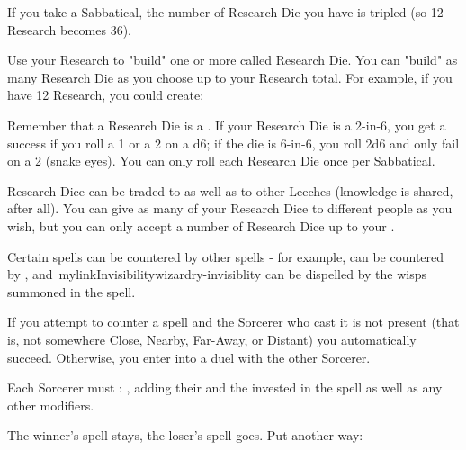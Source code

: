 {If you take a Sabbatical, the number of Research Die you have is tripled (so
12 Research becomes 36).

Use your Research to "build" one or more \KNACK called Research Die. You can
"build" as many Research Die as you choose up to your Research total. For
example, if you have 12 Research, you could create:


Remember that a Research Die is a \KNACK.  If your Research Die is a 2-in-6,
you get a success if you roll a 1 or a 2 on a d6; if the die is 6-in-6, you
roll 2d6 and only fail on a 2 (snake eyes).  You can only roll each Research
Die once per Sabbatical.

Research Dice can be traded to  as well as to
other Leeches (knowledge is shared, after all). You can give as many of your
Research Dice to different people as you wish, but you can only accept a
number of Research Dice up to your .



Certain spells can be countered by other spells - for example,
 can be countered by
, and
\,mylink{Invisibility}{wizardry-invisiblity} can be dispelled by the wisps
summoned in the  spell. 

If you attempt to counter a spell and the Sorcerer who cast it is not
present (that is, not somewhere Close, Nearby, Far-Away, or Distant) you
automatically succeed.  Otherwise, you enter into a duel with the other
Sorcerer.

Each Sorcerer must \RB : \INT, adding their \LVL and the \DICE invested in
the spell as well as any other modifiers.  



The winner's spell stays, the loser's spell goes.  Put another way: 


}
